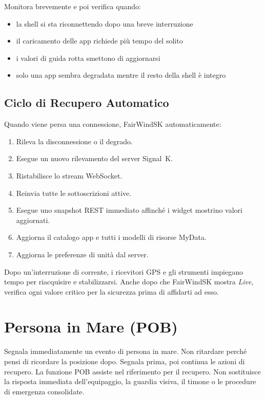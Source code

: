 Monitora brevemente e poi verifica quando:

\begin{itemize}
  \item la shell si sta riconnettendo dopo una breve interruzione
  \item il caricamento delle app richiede più tempo del solito
  \item i valori di guida rotta smettono di aggiornarsi
  \item solo una app sembra degradata mentre il resto della shell è integro
\end{itemize}

\section{Ciclo di Recupero Automatico}

Quando viene persa una connessione, FairWindSK automaticamente:

\begin{enumerate}
  \item Rileva la disconnessione o il degrado.
  \item Esegue un nuovo rilevamento del server Signal~K.
  \item Ristabilisce lo stream WebSocket.
  \item Reinvia tutte le sottoscrizioni attive.
  \item Esegue uno snapshot REST immediato affinché i widget mostrino valori aggiornati.
  \item Aggiorna il catalogo app e tutti i modelli di risorse MyData.
  \item Aggiorna le preferenze di unità dal server.
\end{enumerate}

\begin{warningbox}
Dopo un'interruzione di corrente, i ricevitori GPS e gli strumenti impiegano tempo
per riacquisire e stabilizzarsi.
Anche dopo che FairWindSK mostra \textit{Live}, verifica ogni valore critico per
la sicurezza prima di affidarti ad esso.
\end{warningbox}

\chapter{Persona in Mare (POB)}
\label{ch:pob}

\begin{warningbox}
Segnala immediatamente un evento di persona in mare.
Non ritardare perché pensi di ricordare la posizione dopo.
Segnala prima, poi continua le azioni di recupero.
La funzione POB assiste nel riferimento per il recupero.
Non sostituisce la risposta immediata dell'equipaggio, la guardia visiva,
il timone o le procedure di emergenza consolidate.
\end{warningbox}

